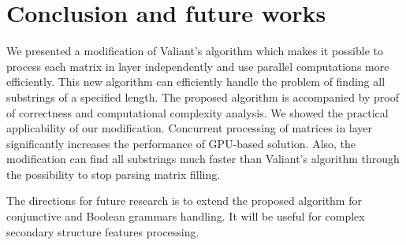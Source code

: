 \section{Conclusion and future works}

We presented a modification of Valiant's algorithm which makes it possible to process each matrix in layer independently and use parallel computations more efficiently.
This new algorithm can efficiently handle the problem of finding all substrings of a specified length.
The proposed algorithm is accompanied by proof of correctness and computational complexity analysis.
We showed the practical applicability of our modification. 
Concurrent processing of matrices in layer significantly increases the performance of GPU-based solution. 
Also, the modification can find all substrings much faster than Valiant's algorithm through the possibility to stop parsing matrix filling.

The directions for future research is to extend the proposed algorithm for conjunctive and Boolean grammars handling.
It will be useful for complex secondary structure features processing.
